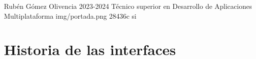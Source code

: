 \documentclass{\ClassPath/yukibook}
\begin{document}
    {Rubén Gómez Olivencia}  %
    {2023-2024}    %
    {Técnico superior en \linebreak Desarrollo de  Aplicaciones Multiplataforma} %
    {}%
    {}%
    {img/portada.png} %
    {28436c}
    {si} %

    \coverpage
    \graphicspath{{../../../yukibook.cls/}}
    \licensepage

    \tableofcontents


    \part{Historia de las interfaces}
    \graphicspath{{./img/di}}
    
\end{document}

